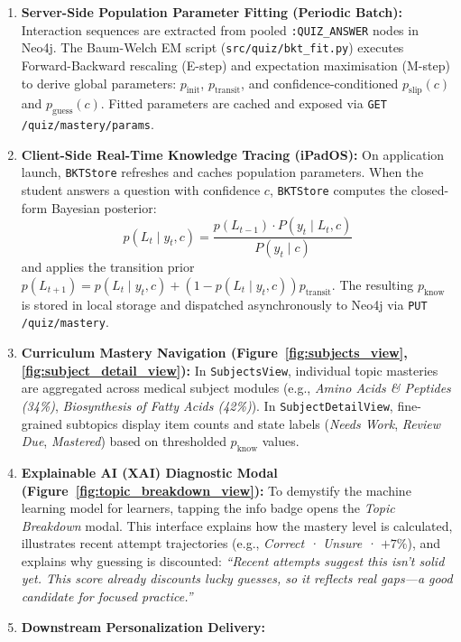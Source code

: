 \begin{enumerate}
    \item \textbf{Server-Side Population Parameter Fitting (Periodic Batch):} Interaction sequences are extracted from pooled \texttt{:QUIZ\_ANSWER} nodes in Neo4j. The Baum-Welch EM script (\texttt{src/quiz/bkt\_fit.py}) executes Forward-Backward rescaling (E-step) and expectation maximisation (M-step) to derive global parameters: $p_{\text{init}}$, $p_{\text{transit}}$, and confidence-conditioned $p_{\text{slip}}(c)$ and $p_{\text{guess}}(c)$. Fitted parameters are cached and exposed via \texttt{GET /quiz/mastery/params}.
    \item \textbf{Client-Side Real-Time Knowledge Tracing (iPadOS):} On application launch, \texttt{BKTStore} refreshes and caches population parameters. When the student answers a question with confidence $c$, \texttt{BKTStore} computes the closed-form Bayesian posterior:
    \begin{equation}
        p(L_t \mid y_t, c) = \frac{p(L_{t-1}) \cdot P(y_t \mid L_t, c)}{P(y_t \mid c)}
    \end{equation}
    and applies the transition prior $p(L_{t+1}) = p(L_t \mid y_t, c) + (1 - p(L_t \mid y_t, c)) p_{\text{transit}}$. The resulting $p_{\text{know}}$ is stored in local storage and dispatched asynchronously to Neo4j via \texttt{PUT /quiz/mastery}.
    \item \textbf{Curriculum Mastery Navigation (Figure~\ref{fig:subjects_view}, \ref{fig:subject_detail_view}):} In \texttt{SubjectsView}, individual topic masteries are aggregated across medical subject modules (e.g., \textit{Amino Acids \& Peptides (34\%)}, \textit{Biosynthesis of Fatty Acids (42\%)}). In \texttt{SubjectDetailView}, fine-grained subtopics display item counts and state labels (\textit{Needs Work}, \textit{Review Due}, \textit{Mastered}) based on thresholded $p_{\text{know}}$ values.
    \item \textbf{Explainable AI (XAI) Diagnostic Modal (Figure~\ref{fig:topic_breakdown_view}):} To demystify the machine learning model for learners, tapping the info badge opens the \textit{Topic Breakdown} modal. This interface explains how the mastery level is calculated, illustrates recent attempt trajectories (e.g., \textit{Correct · Unsure · $+7\%$}), and explains why guessing is discounted: \textit{``Recent attempts suggest this isn't solid yet. This score already discounts lucky guesses, so it reflects real gaps---a good candidate for focused practice.''}
    \item \textbf{Downstream Personalization Delivery:}

\end{enumerate}
